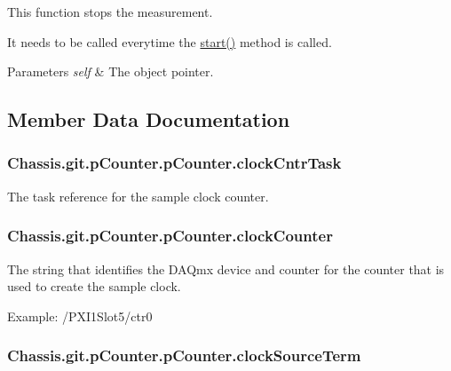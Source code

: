 This function stops the measurement. 

It needs to be called everytime the \hyperlink{class_chassis_8git_1_1p_counter_1_1p_counter_a70605632a820fcbded267beb432fcdb4}{start()} method is called. 
\begin{DoxyParams}{Parameters}
{\em self} & The object pointer. \\
\hline
\end{DoxyParams}


\subsection{Member Data Documentation}
\hypertarget{class_chassis_8git_1_1p_counter_1_1p_counter_a24e9aefcb3db02d776ddf8f3a0a532c9}{
\subsubsection[{clock\-Cntr\-Task}]{\setlength{\rightskip}{0pt plus 5cm}Chassis.\-git.\-p\-Counter.\-p\-Counter.\-clock\-Cntr\-Task}}\label{class_chassis_8git_1_1p_counter_1_1p_counter_a24e9aefcb3db02d776ddf8f3a0a532c9}


The task reference for the sample clock counter. 

\hypertarget{class_chassis_8git_1_1p_counter_1_1p_counter_a786395b8325d54efca86113bb85f0a11}{
\subsubsection[{clock\-Counter}]{\setlength{\rightskip}{0pt plus 5cm}Chassis.\-git.\-p\-Counter.\-p\-Counter.\-clock\-Counter}}\label{class_chassis_8git_1_1p_counter_1_1p_counter_a786395b8325d54efca86113bb85f0a11}


The string that identifies the D\-A\-Qmx device and counter for the counter that is used to create the sample clock. 

Example\-: /\-P\-X\-I1\-Slot5/ctr0 \hypertarget{class_chassis_8git_1_1p_counter_1_1p_counter_a2fb27f44005a6ee09baa193c2e1fcd5b}{
\subsubsection[{clock\-Source\-Term}]{\setlength{\rightskip}{0pt plus 5cm}Chassis.\-git.\-p\-Counter.\-p\-Counter.\-clock\-Source\-Term}}\label{class_chassis_8git_1_1p_counter_1_1p_counter_a2fb27f44005a6ee09baa193c2e1fcd5b}


